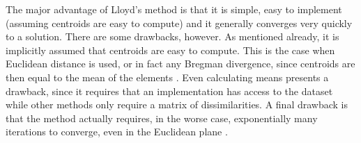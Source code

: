The major advantage of Lloyd's method is that it is simple, easy to implement
(assuming centroids are easy to compute) and it generally converges very
quickly to a solution.  There are some drawbacks, however.  As mentioned
already, it is implicitly assumed that centroids are easy to compute.  This is
the case when Euclidean distance is used, or in fact any Bregman divergence,
since centroids are then equal to the mean of the elements
\citep{telgarsky2010hartigan,banerjee2005clustering}.  Even calculating means
presents a drawback, since it requires that an implementation has access to
the dataset while other methods only require a matrix of dissimilarities.  A
final drawback is that the method actually requires, in the worse case,
exponentially many iterations to converge, even in the Euclidean plane
\citep{vattani2009exponential}.

